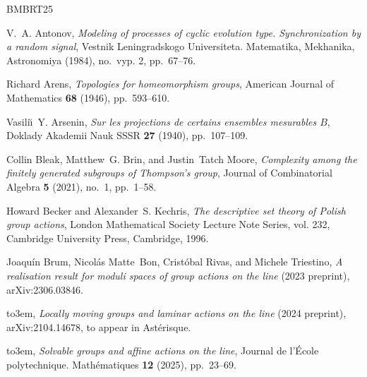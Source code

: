 \documentclass[reqno]{amsart}
\begin{document}
\providecommand{\bysame}{\leavevmode\hbox to3em{\hrulefill}\thinspace}
\providecommand{\MR}{\relax\ifhmode\unskip\space\fi MR }
\providecommand{\MRhref}[2]{%
  \href{http://www.ams.org/mathscinet-getitem?mr=#1}{#2}
}
\providecommand{\href}[2]{#2}
\begin{thebibliography}{BMBRT25}

V.~A. Antonov, \emph{Modeling of processes of cyclic evolution type. {S}ynchronization by a random signal}, Vestnik Leningradskogo Universiteta. Matematika, Mekhanika, Astronomiya (1984), no.~vyp. 2, pp.~67--76.

Richard Arens, \href{https://doi.org/10.2307/2371787}{\emph{Topologies for homeomorphism groups}}, American Journal of Mathematics \textbf{68} (1946), pp.~593--610.

Vasili\u{\i}~Y. Arsenin, \emph{Sur les projections de certains ensembles mesurables {$B$}}, Doklady Akademii Nauk SSSR \textbf{27} (1940), pp.~107--109.

Collin Bleak, Matthew~G. Brin, and Justin~Tatch Moore, \href{https://doi.org/10.4171/jca/49}{\emph{Complexity among the finitely generated subgroups of {T}hompson's group}}, Journal of Combinatorial Algebra \textbf{5} (2021), no.~1, pp.~1--58.

Howard Becker and Alexander~S. Kechris, \href{https://doi.org/10.1017/CBO9780511735264}{\emph{The descriptive set theory of {P}olish group actions}}, London Mathematical Society Lecture Note Series, vol. 232, Cambridge University Press, Cambridge, 1996.

Joaqu\'{i}n Brum, Nicol\'{a}s Matte~Bon, Crist\'{o}bal Rivas, and Michele Triestino, \href{http://arxiv.org/abs/2306.03846}{\emph{A realisation result for moduli spaces of group actions on the line}} (2023 preprint), arXiv:2306.03846.

\bysame, \href{http://arxiv.org/abs/2104.14678}{\emph{Locally moving groups and laminar actions on the line}} (2024 preprint), arXiv:2104.14678, to appear in Ast\'{e}risque.

\bysame, \href{https://doi.org/10.5802/jep.284}{\emph{Solvable groups and affine actions on the line}}, Journal de l'\'{E}cole polytechnique. Math\'{e}matiques \textbf{12} (2025), pp.~23--69.


\end{thebibliography}
\end{document}
